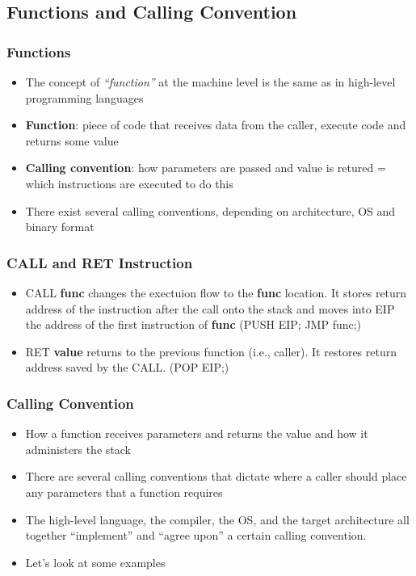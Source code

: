 \documentclass[]{beamer}
\begin{document}
\subsection{Functions and Calling Convention}
\begin{frame}
  \frametitle{Functions}
  \begin{itemize}
  \item{The concept of {\it ``function''} at the machine level is the same as in high-level programming languages}
  \item{{\bf Function}: piece of code that receives data from the caller, execute code and returns some value}
  \item{{\bf Calling convention}: how parameters are passed and value is retured = which instructions are executed to do this}
  \item{There exist several calling conventions, depending on architecture, OS and binary format}
  \end{itemize}
\end{frame}

\begin{frame}
  \frametitle{CALL and RET Instruction}
  \begin{itemize}
  \item{CALL {\bf func} changes the exectuion flow to the {\bf func} location. It stores return address of the instruction after the call onto the stack and moves into EIP the address of the first instruction of {\bf func}} (PUSH EIP; JMP func;)
  \item{RET {\bf value} returns to the previous function (i.e., caller). It restores return address saved by the CALL.} (POP EIP;)
  \end{itemize}
\end{frame}


\begin{frame}
  \frametitle{Calling Convention}
  \begin{itemize}
  \item{How a function receives parameters and returns the value and how it administers the stack}
  \item{There are several calling conventions that dictate where a caller should place any parameters that a function requires}
  \item{The high-level language, the compiler, the OS, and the target architecture all together ``implement'' and ``agree upon'' a certain calling convention.}
  \item{Let's look at some examples}
  \end{itemize}
\end{frame}
\end{document}
